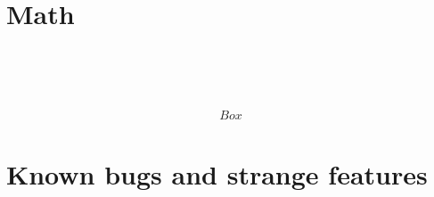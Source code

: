 \documentclass[12pt,a4paper,oneside]{article}
\begin{document}
  \section{Math}
    $$


    \begin{align*}
      
    \end{align*}



    \begin{align*}
      \\

    \end{align*}

    \begin{align*}
      \\Box
    \end{align*}



  \section{Known bugs and strange features}
    
\end{document}
